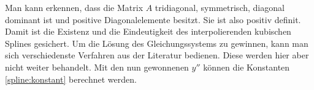 Man kann erkennen, dass die Matrix $A$ tridiagonal, symmetrisch, diagonal dominant ist und positive Diagonalelemente besitzt. Sie ist also positiv definit. Damit ist die Existenz und die Eindeutigkeit des interpolierenden kubischen Splines gesichert. Um die Lösung des Gleichungssystems zu gewinnen, kann man sich verschiedenste Verfahren aus der Literatur \cite{Dahmen2008} bedienen.  Diese werden hier aber nicht weiter behandelt. Mit den nun gewonnenen $y''$ können die Konstanten \ref{spline:konstant} berechnet werden.
